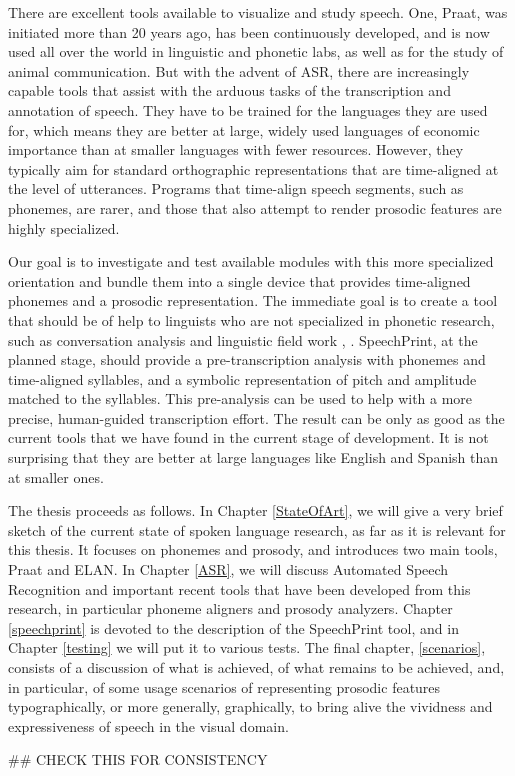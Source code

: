 There are excellent tools available to visualize and study speech. One, Praat, was initiated more than 20 years ago, has been continuously developed, and is now used all over the world in linguistic and phonetic labs, as well as for the study of animal communication. But with the advent of ASR, there are increasingly capable tools that assist with the arduous tasks of the transcription and annotation of speech. They have to be trained for the languages they are used for, which means they are better at large, widely used languages of economic importance than at smaller languages with fewer resources. However, they typically aim for standard orthographic representations that are time-aligned at the level of utterances. Programs that time-align speech segments, such as phonemes, are rarer, and those that also attempt to render prosodic features are highly specialized.

Our goal is to investigate and test available modules with this more specialized orientation and bundle them into a single device that provides time-aligned phonemes and a prosodic representation. The immediate goal is to create a tool that should be of help to linguists who are not specialized in phonetic research, such as conversation analysis \cite{hutchby2008} and linguistic field work \cite{thieberger2012}, \cite{rozhanskiy2021}. SpeechPrint, at the planned stage, should provide a pre-transcription analysis with phonemes and time-aligned syllables, and a symbolic representation of pitch and amplitude matched to the syllables. This pre-analysis can be used to help with a more precise, human-guided transcription effort. The result can be only as good as the current tools that we have found in the current stage of development. It is not surprising that they are better at large languages like English and Spanish than at smaller ones.

The thesis proceeds as follows. In Chapter \ref{StateOfArt}, we will give a very brief sketch of the current state of spoken language research, as far as it is relevant for this thesis. It focuses on phonemes and prosody, and introduces two main tools, Praat and ELAN. In Chapter \ref{ASR}, we will discuss Automated Speech Recognition and important recent tools that have been developed from this research, in particular phoneme aligners and prosody analyzers. Chapter \ref{speechprint} is devoted to the description of the SpeechPrint tool, and in Chapter \ref{testing} we will put it to various tests. The final chapter, \ref{scenarios}, consists of a discussion of what is achieved, of what remains to be achieved, and, in particular, of some usage scenarios of representing prosodic features typographically, or more generally, graphically, to bring alive the vividness and expressiveness of speech in the visual domain.

##  CHECK THIS FOR CONSISTENCY

